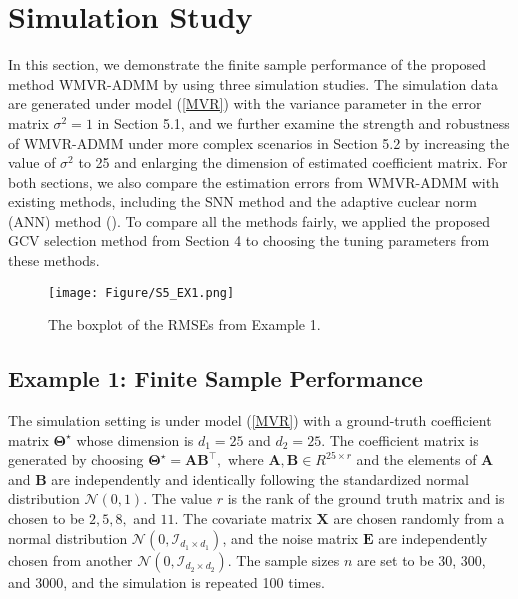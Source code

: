\documentclass[12pt]{article}
\begin{document}
\section{Simulation Study} \label{SC5}
In this section, we demonstrate the finite sample performance of the proposed method WMVR-ADMM by using three simulation studies.   The simulation data are generated under model (\ref{MVR}) with the variance parameter in the error matrix $\sigma^2 = 1$ in Section 5.1, and we further examine the strength and robustness of WMVR-ADMM under more complex scenarios in Section 5.2 by increasing the value of $\sigma^2$ to 25 and enlarging the dimension of estimated coefficient matrix. For both sections, we also compare the estimation errors from WMVR-ADMM with existing methods, including the SNN method  and the adaptive cuclear norm (ANN) method (\cite{chen2013reduced}). To compare all the methods fairly, we applied the proposed GCV selection method from Section 4 to choosing the tuning parameters from these methods.

\begin{figure}[h!]
\texttt{[image: Figure/S5\_EX1.png]}
\centering 
\caption{The boxplot of the RMSEs from Example 1.} 
\label{Fig_S4_Ex1}
\end{figure}

\subsection{Example 1: Finite Sample Performance}

The simulation setting is under model (\ref{MVR}) with a ground-truth coefficient matrix $\boldsymbol{\Theta}^{\star}$  whose dimension is $d_{1} = 25$ and $d_{2} = 25$. The coefficient matrix is generated by choosing $\boldsymbol{\Theta}^{\star}  = \boldsymbol{A}\boldsymbol{B}^{\top},$ where $\boldsymbol{A}, \boldsymbol{B} \in R^{25 \times r}$ and the elements of  $\boldsymbol{A}$ and $\boldsymbol{B}$ are independently and identically following the standardized normal distribution $\mathcal{N}(0, 1)$. The value $r$ is the rank of the ground truth matrix and is chosen to be $2, 5, 8,$ and $11$. The covariate matrix $\boldsymbol{X}$ are chosen randomly from a normal distribution $\mathcal{N}(0, \mathcal{I}_{ d_{1} \times d_{1}})$, and the noise matrix $\boldsymbol{E}$ are independently chosen from another $\mathcal{N}(0, \mathcal{I}_{ d_{2} \times d_{2}})$. The sample sizes $n$ are set to be 30, 300, and 3000, and the simulation is repeated 100 times. 
\end{document}
